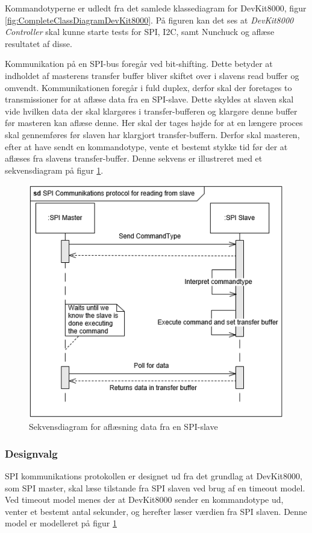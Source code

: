 Kommandotyperne er udledt fra det samlede klassediagram for DevKit8000, figur \ref{fig:CompleteClassDiagramDevKit8000}. På figuren kan det ses at \textit{DevKit8000 Controller} skal kunne starte tests for SPI, I2C, samt Nunchuck og aflæse resultatet af disse.  

Kommunikation på en SPI-bus foregår ved bit-shifting. Dette betyder at indholdet af masterens transfer buffer bliver skiftet over i slavens read buffer og omvendt. Kommunikationen foregår i fuld duplex, derfor skal der foretages to transmissioner for at aflæse data fra en SPI-slave. Dette skyldes at slaven skal vide hvilken data der skal klargøres i transfer-bufferen og klargøre denne buffer før masteren kan aflæse denne. Her skal der tages højde for at en længere proces skal gennemføres før slaven har klargjort transfer-buffern. Derfor skal masteren, efter at have sendt en kommandotype, vente et bestemt stykke tid før der at aflæses fra slavens transfer-buffer. Denne sekvens er illustreret med et sekvensdiagram på figur \ref{figure:SDSpiSlaveRead}.

\begin{figure}[H]
	\centering
	\includegraphics[]{Systemarkitektur/images/SDSpiSlaveRead}
	\caption{Sekvensdiagram for aflæsning data fra en SPI-slave}
	\label{figure:SDSpiSlaveRead}
\end{figure} 

\subsubsection{Designvalg}
SPI kommunikations protokollen er designet ud fra det grundlag at DevKit8000, som SPI master, skal læse tilstande fra SPI slaven ved brug af en timeout model. Ved timeout model menes der at DevKit8000 sender en kommandotype ud, venter et bestemt antal sekunder, og herefter læser værdien fra SPI slaven. Denne model er modelleret på figur \ref{figure:SDSpiSlaveRead}

